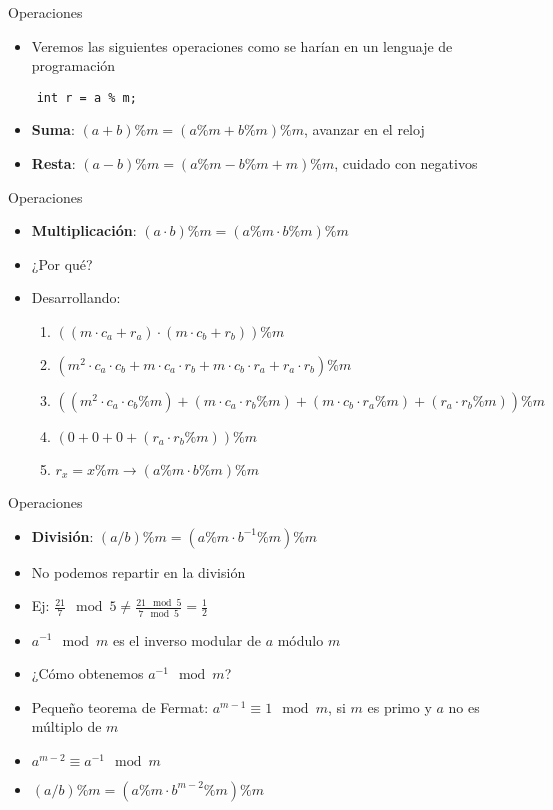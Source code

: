 \documentclass[10pt]{beamer}
\newcommand{\bi}{\begin{itemize}}
\newcommand{\ei}{\end{itemize}}
\begin{document}
\begin{frame}[fragile]{Operaciones}
  \bi
    \item Veremos las siguientes operaciones como se harían en un lenguaje de programación
  \ei
  \begin{verbatim}
    int r = a % m;
  \end{verbatim}
  \bi
    \item<2-> \textbf{Suma}: $(a + b) \% m = (a \% m + b \% m) \% m$, avanzar en el reloj
    \item<3-> \textbf{Resta}: $(a - b) \% m = (a \% m - b \% m + m) \% m$, cuidado con negativos
  \ei
\end{frame}

\begin{frame}{Operaciones}
  \bi
    \item \textbf{Multiplicación}: $(a \cdot b) \% m = (a \% m \cdot b \% m) \% m$
    \item<2-> ¿Por qué?
    \item<3-> Desarrollando:
    \begin{enumerate}
      \item<4-> $((m \cdot c_a + r_a) \cdot (m \cdot c_b + r_b)) \% m$
      \item<5-> $(m^2 \cdot c_a \cdot c_b + m \cdot c_a \cdot r_b + m \cdot c_b \cdot r_a + r_a \cdot r_b) \% m$
      \\ 
      \item<6-> $((m^2 \cdot c_a \cdot c_b \% m) + (m \cdot c_a \cdot r_b \% m) + (m \cdot c_b \cdot r_a \% m) + (r_a \cdot r_b \% m)) \% m$
      \item<7-> $(0 + 0 + 0 + (r_a \cdot r_b \% m)) \% m$
      \item<8-> $r_x = x \% m \rightarrow (a \% m \cdot b \% m) \% m$
    \end{enumerate}
  \ei
\end{frame}

\begin{frame}{Operaciones}
  \bi
    \item \textbf{División}: $(a / b) \% m = (a \% m \cdot b^{-1} \% m) \% m$
    \item No podemos repartir en la división
    \item Ej: $\frac{21}{7} \mod 5 \neq \frac{21\mod 5}{7\mod 5} = \frac{1}{2}$
    
    \vspace{20pt}

    \item<2-> $a^{-1} \mod m$ es el inverso modular de $a$ módulo $m$
    \item<2-> ¿Cómo obtenemos $a^{-1} \mod m$?
    \item<3-> Pequeño teorema de Fermat: $a^{m - 1} \equiv 1 \mod m$, si $m$ es primo y $a$ no es múltiplo de $m$
    \item<4-> $a^{m - 2} \equiv a^{-1} \mod m$
    \item<5-> $(a / b) \% m = (a \% m \cdot b^{m-2} \% m) \% m$
  \ei
\end{frame}
\end{document}
